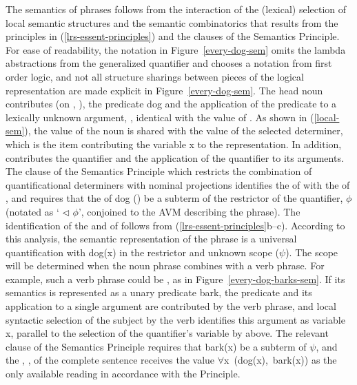 \documentclass[output=paper]{langsci/langscibook}
\begin{document}
The semantics of phrases follows from the interaction of the (lexical) selection of local semantic structures and the semantic combinatorics that results from the principles in (\ref{lrs-essent-principles}) and the clauses of the Semantics Principle.
For ease of readability, the notation in Figure~\ref{every-dog-sem} omits the lambda abstractions from the generalized quantifier and chooses a notation from first order logic, and not all structure sharings between pieces of the logical representation are made explicit in Figure~\ref{every-dog-sem}. The head noun  contributes (on , ), the predicate {\normalfont \sffamily dog} and the application of the predicate to a lexically unknown argument, , identical with the  value of . As shown in (\ref{local-sem}), the  value of the noun is shared with the  value of the selected determiner, which is the item contributing the variable {\normalfont \sffamily x} to the representation. In addition,  contributes the quantifier and the application of the quantifier to its arguments. The clause of the Semantics Principle which restricts the combination of quantificational determiners with nominal projections identifies the  of  with the  of , and requires that the  of dog () be a subterm of the restrictor of the quantifier, $\phi$ (notated as ` $\triangleleft$ $\phi$', conjoined to the AVM describing the phrase). The identification of the  and  of  follows from (\ref{lrs-essent-principles}b--c). According to this analysis, the semantic representation of the phrase  is a universal quantification with {\normalfont \sffamily dog(x)} in the restrictor and unknown scope ($\psi$). The scope will be determined when the noun phrase combines with a verb phrase. For example, such a verb phrase could be , as in  Figure~\ref{every-dog-barks-sem}. If its semantics is represented as a unary predicate {\normalfont \sffamily bark}, the predicate and its application to a single argument are contributed by the verb phrase, and local syntactic selection of the subject  by the verb  identifies this argument as variable {\normalfont \sffamily x}, parallel to the selection of the quantifier's variable by  above. The relevant clause of the Semantics Principle requires that {\normalfont \sffamily bark(x)} be a subterm of $\psi$, and the , , of the complete sentence receives the value \mbox{\normalfont \sffamily $\forall$x (dog(x), bark(x))} as the only available reading in accordance with the  Principle. %
\end{document}
